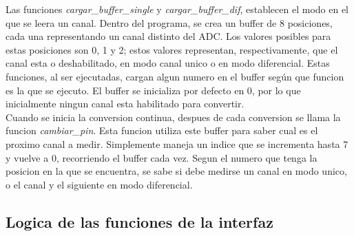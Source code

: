Las funciones \textit{cargar\_buffer\_single} y \textit{cargar\_buffer\_dif}, establecen el modo en el que se leera un canal. Dentro del programa, se crea un buffer de 8 posiciones, cada una representando un canal distinto del ADC. Los valores posibles para estas posiciones son 0, 1 y 2; estos valores representan, respectivamente, que el canal esta o deshabilitado, en modo canal unico o en modo diferencial. Estas funciones, al ser ejecutadas, cargan algun numero en el buffer según que funcion es la que se ejecuto. El buffer se inicializa por defecto en 0, por lo que inicialmente ningun canal esta habilitado para convertir. \\

Cuando se inicia la conversion continua, despues de cada conversion se llama la funcion \textit{cambiar\_pin}. Esta funcion utiliza este buffer para saber cual es el proximo canal a medir. Simplemente maneja un indice que se incrementa hasta 7 y vuelve a 0, recorriendo el buffer cada vez. Segun el numero que tenga la posicion en la que se encuentra, se sabe si debe medirse un canal en modo unico, o el canal y el siguiente en modo diferencial. \\




\subsection{Logica de las funciones de la interfaz} %
\label{sub:logica_de_las_funciones_de_la_interfaz}

